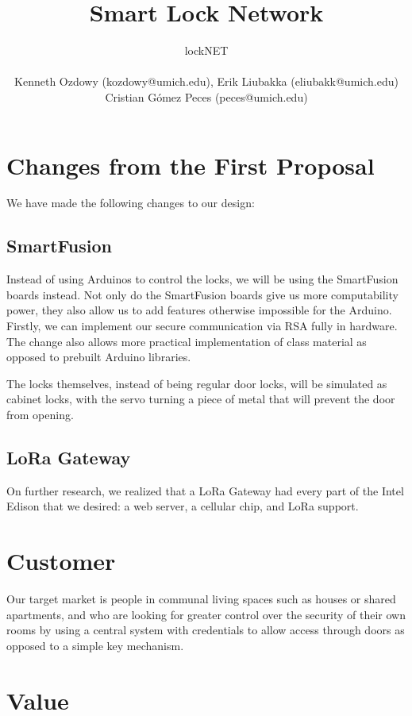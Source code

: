 \documentclass{article}
\title{Smart Lock Network}
\author{
  lockNET \\ \\
  Kenneth Ozdowy (kozdowy@umich.edu), Erik Liubakka (eliubakk@umich.edu) \\
  Cristian G\'{o}mez Peces (peces@umich.edu)
}
\date{}
\begin{document}
\maketitle

\section*{Changes from the First Proposal}

We have made the following changes to our design:

\subsection*{SmartFusion}

Instead of using Arduinos to control the locks, we will be using the SmartFusion
boards instead. Not only do the SmartFusion boards give us more computability
power, they also allow us to add features otherwise impossible for the Arduino.
Firstly, we can implement our secure communication via RSA fully in hardware.
The change also allows more practical implementation of class material as opposed to
prebuilt Arduino libraries.

The locks themselves, instead of being regular door locks, will be simulated as
cabinet locks, with the servo turning a piece of metal that will prevent the
door from opening.

\subsection*{LoRa Gateway}

On further research, we realized that a LoRa Gateway had every part of the Intel
Edison that we desired: a web server, a cellular chip, and LoRa support. 

\section{Customer}
Our target market is people in communal living spaces such as houses or shared
apartments, and who are looking for greater control over the security of their
own rooms by using a central system with credentials to allow access through
doors as opposed to a simple key mechanism.

\section{Value}
\end{document}
